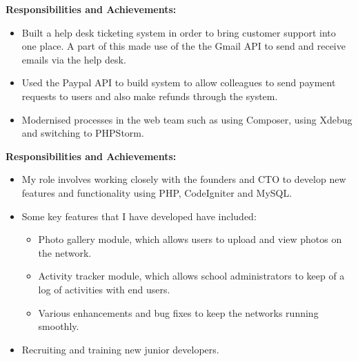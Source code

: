 \documentclass[11pt,a4paper,sans]{moderncv}
\begin{document}
\textbf{Responsibilities and Achievements:}%
\begin{itemize}%
\item Built a help desk ticketing system in order to bring customer support into one place. A part of this made use of the the Gmail API to send and receive emails via the help desk.
\item Used the Paypal API to build system to allow colleagues to send payment requests to users and also make refunds through the system.
\item Modernised processes in the web team such as using Composer, using Xdebug and switching to PHPStorm.  \\  
\end{itemize}%
{}
\textbf{Responsibilities and Achievements:}%
\begin{itemize}%
\item My role involves working closely with the founders and CTO to develop new features and functionality using PHP, CodeIgniter and MySQL.
\item Some key features that I have developed have included:
	\begin{itemize}%
		\item Photo gallery module, which allows users to upload and view photos on the network. 
		\item Activity tracker module, which allows school administrators to keep of a log of activities with end users.
		\item Various enhancements and bug fixes to keep the networks running smoothly.
	\end{itemize}
\item Recruiting and training new junior developers.\\
\end{itemize}
\end{document}
